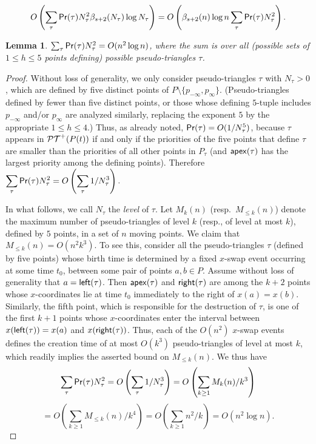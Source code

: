 \documentclass[11pt]{article}
\def\PT{{\cal PT}}
\def\prob{{\sf Pr}}
\def\Left{{\sf left}}
\def\Right{{\sf right}}
\def\apex{{\sf apex}}
\newtheorem{lemma}[theorem]{Lemma}
\begin{document}
$$
 O\left(\sum_\tau \prob(\tau) N^2_\tau \beta_{s+2}(N_\tau) \log N_\tau\right)=
 O\left(\beta_{s+2}(n)\log n\sum_{\tau}\prob(\tau)N_\tau^2\right).
$$


\begin{lemma}\label{Lemma:BoundSumQuads} 
$\sum_\tau \prob(\tau) N^2_\tau = O(n^2\log n)$, where the sum is over all (possible sets of $1\leq h\leq 5$ points defining) possible pseudo-triangles $\tau$.
\end{lemma}


\begin{proof}
Without loss of generality, we only consider pseudo-triangles $\tau$ with $N_\tau>0$, which are defined by five distinct points of $P\setminus\{p_{-\infty}, p_{\infty}\}$. (Pseudo-triangles defined by fewer than five distinct points, or those
whose defining $5$-tuple includes $p_{-\infty}$ and/or $p_{\infty}$ are analyzed similarly, replacing the exponent $5$ by the appropriate $1\leq h\leq 4$.)
Thus, as already noted, $\prob(\tau)  = O(1/N_\tau^5)$, because $\tau$ appears in $\PT^+(P(t))$ if and only if the priorities of the
five points that define $\tau$ are smaller than the priorities of 
all other points in $P_\tau$
(and $\apex(\tau)$ has the largest priority among the defining points).
Therefore
$\displaystyle
\sum_\tau \prob(\tau)N_\tau^2 = O\left(\sum_\tau 1/N_\tau^3\right).$

In what follows, we call $N_\tau$ 
 the {\em level} of $\tau$.
Let $M_k(n)$ (resp.\ $M_{\le k}(n)$) denote the
maximum number of pseudo-triangles of level $k$ (resp., of level at most $k$), defined by $5$ points, in a set of
 $n$ moving points.
We claim that $M_{\leq k}(n)=O(n^2k^3)$. To see this, consider all the pseudo-triangles $\tau$ (defined by five points) whose birth time is determined by a fixed $x$-swap event occurring at some time $t_0$, between some pair of points $a,b\in P$. Assume without loss of generality that $a=\Left(\tau)$. Then $\apex(\tau)$ and $\Right(\tau)$ are among the $k+2$ points whose $x$-coordinates lie at time $t_0$ immediately to the right of $x(a)=x(b)$.
Similarly, the fifth point, which is responsible for the destruction of $\tau$, is one of the first $k+1$ points whose $x$-coordinates enter the interval between $x(\Left(\tau))=x(a)$ and $x(\Right(\tau))$. Thus, each of the $O(n^2)$ $x$-swap events defines the creation time of at most $O(k^3)$ pseudo-triangles of level at most $k$, which readily implies the asserted bound on $M_{\leq k}(n)$. We thus have
$$
\sum_\tau \prob(\tau) N^2_\tau = O\left(\sum_\tau 1/N_\tau^3\right)
= O\left(\sum_{k\geq 1} M_k(n)/k^3\right)
$$
$$
= O\left( \sum_{k\geq 1} M_{\le k}(n)/k^4 \right) =  O\left( \sum_{k\geq 1} n^2/k \right)  =  O(n^2\log n).
$$
\end{proof}
\end{document}
